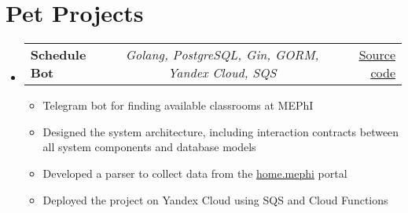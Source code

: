 \documentclass[a4paper,11pt]{article}
\makeatletter
\newcommand{\resumeItem}[1]{
  \item\small{#1}
}
\newcommand{\resumeItemListStart}{\begin{itemize}[rightmargin=0.11in]}
\newcommand{\resumeItemListEnd}{\end{itemize}}
\newcommand{\resumeTrioHeading}[3]{
  \item\small{
    \begin{tabular*}{0.96\textwidth}[t]{
      l@{\extracolsep{\fill}}c@{\extracolsep{\fill}}r
    }
      \textbf{#1} & \textit{#2} & #3
    \end{tabular*}
  }
}
\newcommand{\resumeHeadingListStart}{
  \begin{itemize}[leftmargin=0.15in, label={}]
}
\newcommand{\resumeHeadingListEnd}{\end{itemize}}
\makeatother
\begin{document}
       
\section{Pet Projects}
\resumeHeadingListStart{}
  \resumeTrioHeading{Schedule Bot}{Golang, PostgreSQL, Gin, GORM, Yandex Cloud, SQS}{\href{https://github.com/PotatoHD404/ParallelDB}{\uline{Source code}}}
  \resumeItemListStart{}
    \resumeItem{Telegram bot for finding available classrooms at MEPhI}
    \resumeItem{Designed the system architecture, including interaction contracts between all system components and database models}
    \resumeItem{Developed a parser to collect data from the \href{https://home.mephi.ru}{home.mephi} portal}
    \resumeItem{Deployed the project on Yandex Cloud using SQS and Cloud Functions}
  \resumeItemListEnd{}
\resumeHeadingListEnd{}
\end{document}

